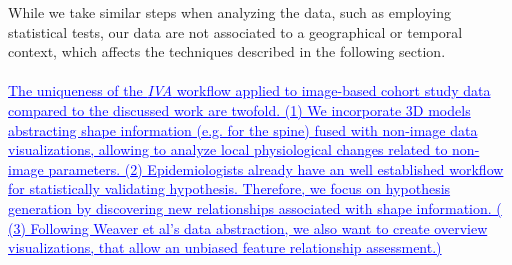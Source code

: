 \documentclass[journal]{style/vgtc} 			          %
\newcommand{\add}[1]{\textcolor{blue}{\uline{#1}}}
\begin{document}
While we take similar steps when analyzing the data, such as employing statistical tests, our data are not associated to a geographical or temporal context, which affects the techniques described in the following section.
\\\\
\add{The uniqueness of the \emph{IVA} workflow applied to image-based cohort study data compared to the discussed work are twofold.
%
(1) We incorporate 3D models abstracting shape information (e.g. for the spine) fused with non-image data visualizations, allowing to analyze local physiological changes related to non-image parameters.
%
(2) Epidemiologists already have an well established workflow for statistically validating hypothesis. 
%
Therefore, we focus on hypothesis generation by discovering new relationships associated with shape information.
%
( (3) Following Weaver et al's data abstraction, we also want to create overview visualizations, that allow an unbiased feature relationship assessment.)
}

\end{document}
